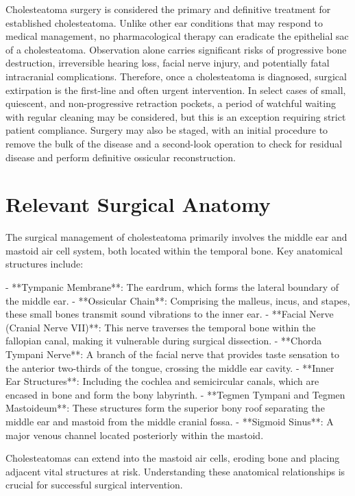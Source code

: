Cholesteatoma surgery is considered the primary and definitive treatment for established cholesteatoma. Unlike other ear conditions that may respond to medical management, no pharmacological therapy can eradicate the epithelial sac of a cholesteatoma. Observation alone carries significant risks of progressive bone destruction, irreversible hearing loss, facial nerve injury, and potentially fatal intracranial complications. Therefore, once a cholesteatoma is diagnosed, surgical extirpation is the first-line and often urgent intervention. In select cases of small, quiescent, and non-progressive retraction pockets, a period of watchful waiting with regular cleaning may be considered, but this is an exception requiring strict patient compliance. Surgery may also be staged, with an initial procedure to remove the bulk of the disease and a second-look operation to check for residual disease and perform definitive ossicular reconstruction.

\section*{Relevant Surgical Anatomy}
The surgical management of cholesteatoma primarily involves the middle ear and mastoid air cell system, both located within the temporal bone. Key anatomical structures include:

- **Tympanic Membrane**: The eardrum, which forms the lateral boundary of the middle ear.
- **Ossicular Chain**: Comprising the malleus, incus, and stapes, these small bones transmit sound vibrations to the inner ear.
- **Facial Nerve (Cranial Nerve VII)**: This nerve traverses the temporal bone within the fallopian canal, making it vulnerable during surgical dissection.
- **Chorda Tympani Nerve**: A branch of the facial nerve that provides taste sensation to the anterior two-thirds of the tongue, crossing the middle ear cavity.
- **Inner Ear Structures**: Including the cochlea and semicircular canals, which are encased in bone and form the bony labyrinth.
- **Tegmen Tympani and Tegmen Mastoideum**: These structures form the superior bony roof separating the middle ear and mastoid from the middle cranial fossa.
- **Sigmoid Sinus**: A major venous channel located posteriorly within the mastoid.

Cholesteatomas can extend into the mastoid air cells, eroding bone and placing adjacent vital structures at risk. Understanding these anatomical relationships is crucial for successful surgical intervention.

